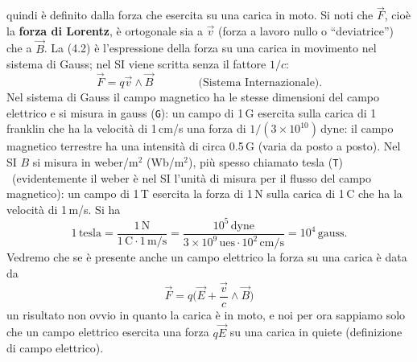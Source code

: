 quindi \`e definito dalla forza che esercita su una carica in moto. Si noti che
$\vec F$, cio\`e la \textbf{forza di Lorentz}, \`e ortogonale sia a $\vec v$
(forza a lavoro nullo o ``deviatrice'') che a $\vec B$. La (4.2) \`e
l'espressione della forza su una carica in movimento nel sistema di Gauss; nel
SI viene scritta senza il fattore $1/c$:
\begin{equation}
  \vec F=q\vec v\wedge\vec B\qquad\qquad\text{(Sistema Internazionale)}.
  \tag{4.2'}
\end{equation}
Nel sistema di Gauss il campo magnetico ha le stesse dimensioni del campo
elettrico e si misura in gauss (\texttt{G}): un campo di 1\,G esercita sulla
carica di 1\,franklin che ha la velocit\`a di 1\,cm/s una forza di
$1/(3\times10^{10})$\,dyne: il campo magnetico terrestre ha una intensit\`a di
circa 0.5\,G (varia da posto a posto). Nel SI $B$ si misura in weber/m$^2$
(Wb/m$^2$), pi\`u spesso chiamato tesla (\texttt{T}) \ (evidentemente il weber
\`e nel SI l'unit\`a di misura per il flusso del campo magnetico): un campo di
1\,T esercita la forza di 1\,N sulla carica di 1\,C che ha la velocit\`a di
1\,m/s. Si ha
\begin{equation}
  1\,\mathrm{tesla}=\frac{1\,\mathrm N}{1\,\mathrm C\cdot1\,\mathrm{m/s}}
  =\frac{10^5\,\mathrm{dyne}}{3\times10^9\,\mathrm{ues}\cdot10^2\,\mathrm{cm/s}}
  =10^4\,\mathrm{gauss}.
  \tag{4.3}
\end{equation}
Vedremo che se \`e presente anche un campo elettrico la forza su una carica \`e
data da
\begin{equation}
  \vec F=q\Big(\vec E+\frac{\vec v}{c}\wedge\vec B\Big)
  \tag{4.4}
\end{equation}
un risultato non ovvio in quanto la carica \`e in moto, e noi per ora sappiamo
solo che un campo elettrico esercita una forza $q\vec E$ su una carica in quiete
(definizione di campo elettrico).

